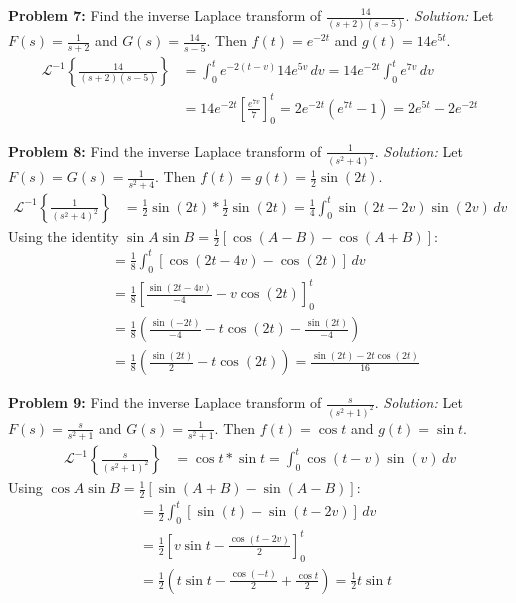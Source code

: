 \documentclass[11pt, letterpaper]{article}
\theoremstyle{definition}
\theoremstyle{remark}
\begin{document}
\textbf{Problem 7:} Find the inverse Laplace transform of $\frac{14}{(s+2)(s-5)}$.
\textit{Solution:}
Let $F(s) = \frac{1}{s+2}$ and $G(s) = \frac{14}{s-5}$. Then $f(t) = e^{-2t}$ and $g(t) = 14e^{5t}$.
\begin{align*}
\mathscr{L}^{-1}\left\{\frac{14}{(s+2)(s-5)}\right\} &= \int_0^t e^{-2(t-v)} 14e^{5v} \, dv = 14e^{-2t} \int_0^t e^{7v} \, dv \\[4pt]
&= 14e^{-2t} \left[ \frac{e^{7v}}{7} \right]_0^t = 2e^{-2t}(e^{7t} - 1) = 2e^{5t} - 2e^{-2t}
\end{align*}

\textbf{Problem 8:} Find the inverse Laplace transform of $\frac{1}{(s^2+4)^2}$.
\textit{Solution:}
Let $F(s) = G(s) = \frac{1}{s^2+4}$. Then $f(t) = g(t) = \frac{1}{2}\sin(2t)$.
\begin{align*}
\mathscr{L}^{-1}\left\{\frac{1}{(s^2+4)^2}\right\} &= \frac{1}{2}\sin(2t) * \frac{1}{2}\sin(2t) = \frac{1}{4} \int_0^t \sin(2t-2v)\sin(2v) \, dv
\end{align*}
Using the identity $\sin A \sin B = \frac{1}{2}[\cos(A-B) - \cos(A+B)]$:
\begin{align*}
&= \frac{1}{8} \int_0^t [\cos(2t-4v) - \cos(2t)] \, dv \\[4pt]
&= \frac{1}{8} \left[ \frac{\sin(2t-4v)}{-4} - v\cos(2t) \right]_0^t \\[4pt]
&= \frac{1}{8} \left( \frac{\sin(-2t)}{-4} - t\cos(2t) - \frac{\sin(2t)}{-4} \right) \\[4pt]
&= \frac{1}{8} \left( \frac{\sin(2t)}{2} - t\cos(2t) \right) = \frac{\sin(2t) - 2t\cos(2t)}{16}
\end{align*}

\textbf{Problem 9:} Find the inverse Laplace transform of $\frac{s}{(s^2+1)^2}$.
\textit{Solution:}
Let $F(s) = \frac{s}{s^2+1}$ and $G(s) = \frac{1}{s^2+1}$. Then $f(t) = \cos t$ and $g(t) = \sin t$.
\begin{align*}
\mathscr{L}^{-1}\left\{\frac{s}{(s^2+1)^2}\right\} &= \cos t * \sin t = \int_0^t \cos(t-v)\sin(v) \, dv
\end{align*}
Using $\cos A \sin B = \frac{1}{2}[\sin(A+B) - \sin(A-B)]$:
\begin{align*}
&= \frac{1}{2} \int_0^t [\sin(t) - \sin(t-2v)] \, dv \\[4pt]
&= \frac{1}{2} \left[ v\sin t - \frac{\cos(t-2v)}{2} \right]_0^t \\[4pt]
&= \frac{1}{2} \left( t\sin t - \frac{\cos(-t)}{2} + \frac{\cos t}{2} \right) = \frac{1}{2}t\sin t
\end{align*}
\end{document}
